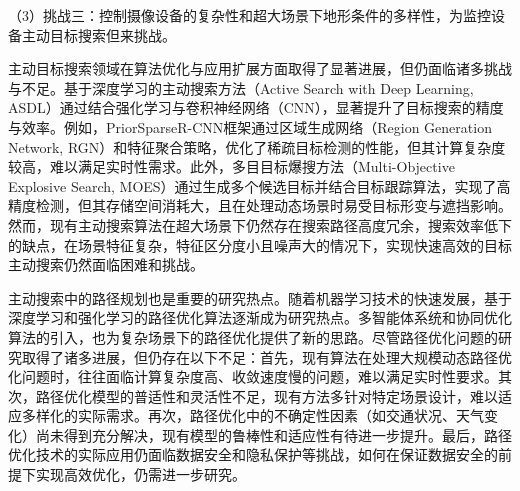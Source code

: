 （3）挑战三：控制摄像设备的复杂性和超大场景下地形条件的多样性，为监控设备主动目标搜索但来挑战。

主动目标搜索领域在算法优化与应用扩展方面取得了显著进展，但仍面临诸多挑战与不足。基于深度学习的主动搜索方法\cite{DBLP:conf/iclr/HottungKT22}（Active Search with Deep Learning, ASDL）通过结合强化学习与卷积神经网络（CNN），显著提升了目标搜索的精度与效率。例如，PriorSparseR-CNN框架\cite{wang2024priorsparse}通过区域生成网络（Region Generation Network, RGN）和特征聚合策略，优化了稀疏目标检测的性能，但其计算复杂度较高，难以满足实时性需求。此外，多目目标爆搜方法（Multi-Objective Explosive Search, MOES）\cite{moes2024}通过生成多个候选目标并结合目标跟踪算法，实现了高精度检测，但其存储空间消耗大，且在处理动态场景时易受目标形变与遮挡影响。
然而，现有主动搜索算法在超大场景下仍然存在搜索路径高度冗余，搜索效率低下的缺点，在场景特征复杂，特征区分度小且噪声大的情况下，实现快速高效的目标主动搜索仍然面临困难和挑战。

主动搜索中的路径规划也是重要的研究热点。随着机器学习技术的快速发展，基于深度学习和强化学习的路径优化算法逐渐成为研究热点\cite{zhang2025pathoptimization}。多智能体系统和协同优化算法的引入，也为复杂场景下的路径优化提供了新的思路。尽管路径优化问题的研究取得了诸多进展，但仍存在以下不足：首先，现有算法在处理大规模动态路径优化问题时，往往面临计算复杂度高、收敛速度慢的问题，难以满足实时性要求。其次，路径优化模型的普适性和灵活性不足，现有方法多针对特定场景设计，难以适应多样化的实际需求。再次，路径优化中的不确定性因素（如交通状况、天气变化）尚未得到充分解决，现有模型的鲁棒性和适应性有待进一步提升。最后，路径优化技术的实际应用仍面临数据安全和隐私保护等挑战，如何在保证数据安全的前提下实现高效优化，仍需进一步研究。
























